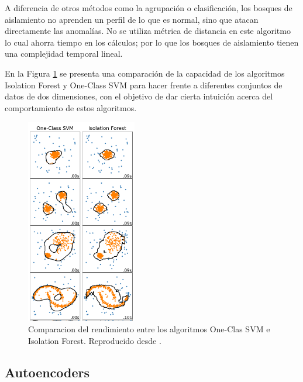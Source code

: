 \vspace{5mm} %

A diferencia de otros métodos como la agrupación o clasificación, los bosques de aislamiento no aprenden un perfil de lo que es normal, sino que atacan directamente las anomalías. No se utiliza métrica de distancia en este algoritmo lo cual ahorra tiempo en los cálculos; por lo que los bosques de aislamiento tienen una complejidad temporal lineal. 

\vspace{5mm} %

En la Figura \ref{fig:comparacion} se presenta una comparaci\'{o}n de la capacidad de los algoritmos Isolation Forest y One-Class SVM para hacer frente a diferentes conjuntos de datos de dos dimensiones, con el objetivo de dar cierta intuici\'{o}n acerca del comportamiento de estos algoritmos.

\begin{figure}[h!]
  \begin{center}	\includegraphics[width=0.43\textwidth, frame]{imagenes/Cap4/comp_if_ocsvm}
  \caption{Comparacion del rendimiento entre los algoritmos One-Clas SVM e Isolation Forest. Reproducido desde \protect\cite{Reference73}.} 
  \label{fig:comparacion}
  \end{center}
\end{figure}

\subsection{Autoencoders}

